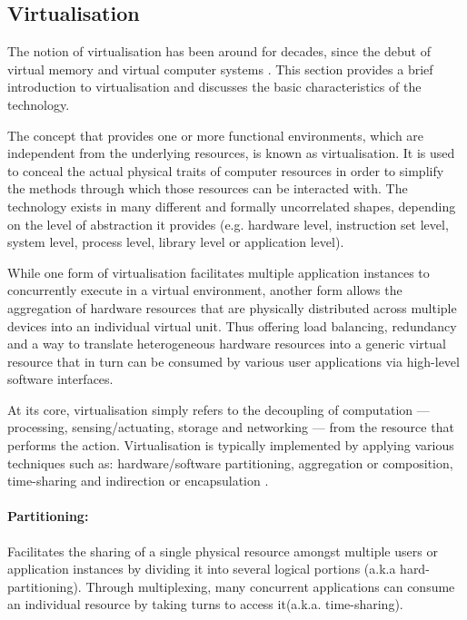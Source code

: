 \subsection{Virtualisation}
The notion of virtualisation has been around for decades, since the debut of virtual memory \cite{denning1970virtual} and virtual computer systems \cite{goldberg1973architectural}.
This section provides a brief introduction to virtualisation and discusses the basic characteristics of the technology.

The concept that provides one or more functional environments, which are independent from the underlying resources, is known as virtualisation. It is used to conceal the actual physical traits of computer resources in order to simplify the methods through which those resources can be interacted with. The technology exists in many different and formally uncorrelated shapes, depending on the level of abstraction it provides (e.g. hardware level, instruction set level, system level, process level, library level or application level). 


While one form of virtualisation facilitates multiple application instances to concurrently execute in a virtual environment, another form allows the aggregation of hardware resources that are physically distributed across multiple devices into an individual virtual unit. Thus offering load balancing, redundancy and a way to translate heterogeneous hardware resources into a generic virtual resource that in turn can be consumed by various user applications via high-level software interfaces. 


At its core, virtualisation simply refers to the decoupling of computation — processing, sensing/actuating, storage and networking — from the resource that performs the action. Virtualisation is typically implemented by applying various techniques such as: hardware/software partitioning, aggregation or composition, time-sharing and indirection or encapsulation \cite{fortes2005guest}. 

\paragraph{Partitioning:} Facilitates the sharing of a single physical resource amongst multiple users or application instances by dividing it into several logical portions (a.k.a hard-partitioning). Through multiplexing, many concurrent applications can consume an individual resource by taking turns to access it(a.k.a. time-sharing).   


